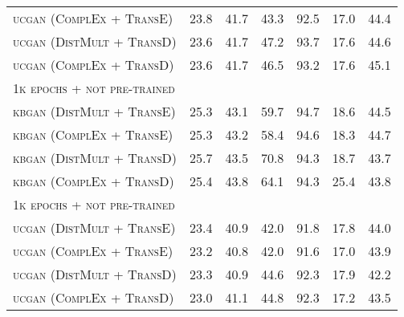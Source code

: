 \begin{table}[h]
\begin{tabular}{lllllll}
          \textsc{ucgan} (\textsc{ComplEx} + \textsc{TransE})  
          & 23.8 & 41.7 & 43.3 & 92.5 & 17.0 & 44.4 \\
          
          \textsc{ucgan} (\textsc{DistMult} + \textsc{TransD})  
          & 23.6  & 41.7 & 47.2 & 93.7 & 17.6 & 44.6 \\

          \textsc{ucgan} (\textsc{ComplEx} + \textsc{TransD})  
          & 23.6 & 41.7 & 46.5 & 93.2 & 17.6 & 45.1 \\
         
          
          \midrule
        \textsc{1k epochs + not pre-trained} 
          &  &  &  &  &  & \\
          
          \textsc{kbgan} (\textsc{DistMult} + \textsc{TransE})  
          & 25.3 & 43.1 & 59.7 & 94.7 & 18.6 & 44.5 \\
          
          \textsc{kbgan} (\textsc{ComplEx} + \textsc{TransE})  
          & 25.3 & 43.2 & 58.4 & 94.6 & 18.3 & 44.7 \\
          
          \textsc{kbgan} (\textsc{DistMult} + \textsc{TransD})  
          & 25.7 & 43.5 & 70.8 & 94.3 & 18.7 & 43.7 \\

          \textsc{kbgan} (\textsc{ComplEx} + \textsc{TransD})  
          & 25.4 & 43.8 & 64.1 & 94.3 & 25.4 & 43.8 \\
          
          \midrule
         
         \textsc{1k epochs + not pre-trained} 
          &  &  &  &  &  & \\
          
          \textsc{ucgan} (\textsc{DistMult} + \textsc{TransE}) 
          & 23.4  & 40.9 & 42.0 & 91.8 & 17.8 & 44.0\\
         
         \textsc{ucgan} (\textsc{ComplEx} + \textsc{TransE}) 
          & 23.2  & 40.8 & 42.0 & 91.6 & 17.0 & 43.9 \\
          
          \textsc{ucgan} (\textsc{DistMult} + \textsc{TransD}) 
          & 23.3 & 40.9 & 44.6 & 92.3 & 17.9 & 42.2 \\
        
        \textsc{ucgan} (\textsc{ComplEx} + \textsc{TransD}) 
          & 23.0  & 41.1 & 44.8 & 92.3 & 17.2 & 43.5 \\
          

\end{tabular}
\end{table}
